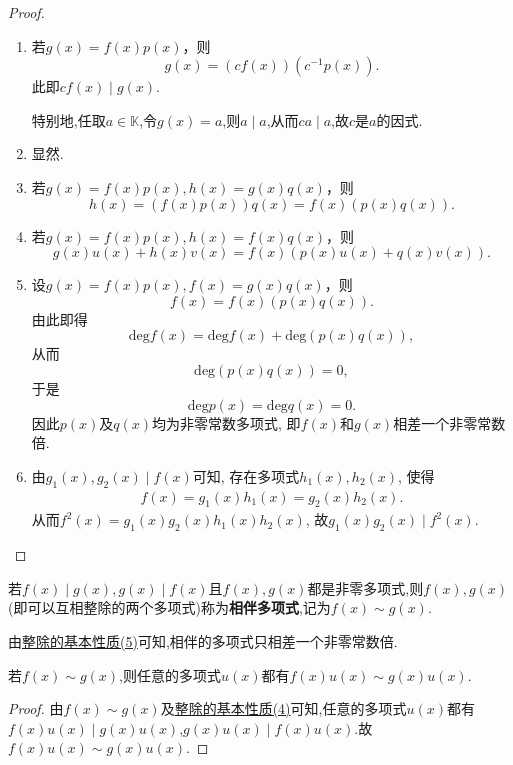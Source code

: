 \documentclass[../../main.tex]{subfiles}%
\begin{document}
\begin{proof}
\begin{enumerate}[(1)]
\item 若\(g(x)=f(x)p(x)\)，则
\[
g(x)=(cf(x))(c^{-1}p(x)).
\]
此即\(cf(x)\mid g(x)\).

特别地,任取$a\in \mathbb{K}$,令$g(x)=a$,则$a\mid a$,从而$ca \mid a$,故$c$是$a$的因式.

\item 显然.

\item 若\(g(x)=f(x)p(x),h(x)=g(x)q(x)\)，则
\[
h(x)=(f(x)p(x))q(x)=f(x)(p(x)q(x)).
\]

\item 若\(g(x)=f(x)p(x),h(x)=f(x)q(x)\)，则
\[
g(x)u(x)+h(x)v(x)=f(x)(p(x)u(x)+q(x)v(x)).
\]

\item 设\(g(x)=f(x)p(x),f(x)=g(x)q(x)\)，则
\[
f(x)=f(x)(p(x)q(x)).
\]
由此即得
\[
\mathrm{deg }f(x)=\mathrm{deg }f(x)+\mathrm{deg}(p(x)q(x)),
\]
从而
\[
\mathrm{deg}(p(x)q(x)) = 0,
\]
于是
\[
\mathrm{deg }p(x)=\mathrm{deg }q(x)=0.
\]
因此\(p(x)\)及\(q(x)\)均为非零常数多项式, 即\(f(x)\)和\(g(x)\)相差一个非零常数倍.

\item 由\(g_1(x),g_2(x)\mid f(x)\)可知, 存在多项式\(h_1(x),h_2(x)\), 使得
\begin{align*}
f(x) = g_1(x)h_1(x) = g_2(x)h_2(x).
\end{align*}
从而\(f^2(x) = g_1(x)g_2(x)h_1(x)h_2(x)\), 故\(g_1(x)g_2(x)\mid f^2(x)\). 
\end{enumerate}
\end{proof}

\begin{definition}[相伴多项式]\label{definition:}
若\(f(x)\mid g(x),g(x)\mid f(x)\)且\(f(x),g(x)\)都是非零多项式,则$f(x),g(x)$(即可以互相整除的两个多项式)称为\textbf{相伴多项式},记为\(f(x)\sim g(x)\).
\end{definition}
\begin{note}
由\hyperref[proposition:整除的基本性质]{整除的基本性质(5)}可知,相伴的多项式只相差一个非零常数倍.
\end{note}

\begin{proposition}[相伴多项式的基本性质]\label{proposition:相伴多项式的基本性质}
若$f(x)\sim g(x)$,则任意的多项式$u(x)$都有$f(x)u(x)\sim g(x)u(x)$.
\end{proposition}
\begin{proof}
由$f(x)\sim g(x)$及\hyperref[proposition:整除的基本性质]{整除的基本性质(4)}可知,任意的多项式$u(x)$都有$f(x)u(x)\mid g(x)u(x)$,$g(x)u(x)\mid f(x)u(x)$.故$f(x)u(x)\sim g(x)u(x)$.
\end{proof}
\end{document}

